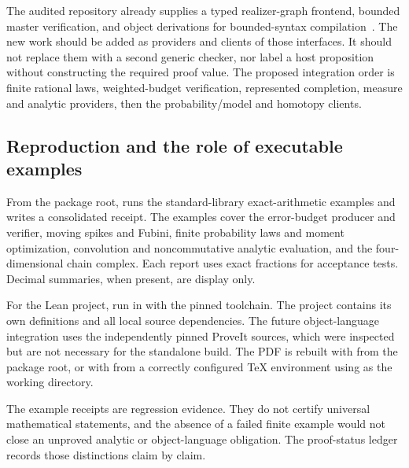 The audited repository already supplies a typed realizer-graph frontend, bounded master verification, and object derivations for bounded-syntax compilation~\cite{repo-interfaces}. The new work should be added as providers and clients of those interfaces. It should not replace them with a second generic checker, nor label a host proposition  without constructing the required proof value. The proposed integration order is finite rational laws, weighted-budget verification, represented completion, measure and analytic providers, then the probability/model and homotopy clients.

\subsection{Reproduction and the role of executable examples}

From the package root,  runs the standard-library exact-arithmetic examples and writes a consolidated receipt. The examples cover the error-budget producer and verifier, moving spikes and Fubini, finite probability laws and moment optimization, convolution and noncommutative analytic evaluation, and the four-dimensional chain complex. Each report uses exact fractions for acceptance tests. Decimal summaries, when present, are display only.

For the Lean project, run  in  with the pinned toolchain. The project contains its own definitions and all local source dependencies. The future object-language integration uses the independently pinned ProveIt sources, which were inspected but are not necessary for the standalone build. The PDF is rebuilt with  from the package root, or with  from a correctly configured TeX environment using  as the working directory.

The example receipts are regression evidence. They do not certify universal mathematical statements, and the absence of a failed finite example would not close an unproved analytic or object-language obligation. The proof-status ledger records those distinctions claim by claim.
